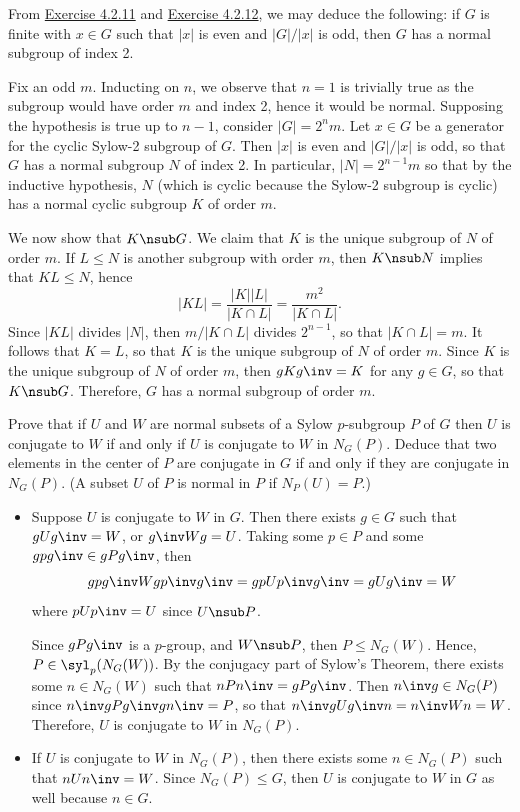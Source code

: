 \begin{sol}
	From \hyperref[ex4.2.11]{Exercise 4.2.11} and \hyperref[ex4.2.12]{Exercise 4.2.12}, we may deduce the following: if $G$ is finite with $x \in G$ such that $|x|$ is even and $|G|/|x|$ is odd, then $G$ has a normal subgroup of index 2.

	Fix an odd $m$. Inducting on $n$, we observe that $n = 1$ is trivially true as the subgroup would have order $m$ and index 2, hence it would be normal. Supposing the hypothesis is true up to $n - 1$, consider $|G| = 2^nm$. Let $x \in G$ be a generator for the cyclic Sylow-2 subgroup of $G$. Then $|x|$ is even and $|G|/|x|$ is odd, so that $G$ has a normal subgroup $N$ of index 2. In particular, $|N| = 2^{n - 1}m$ so that by the inductive hypothesis, $N$ (which is cyclic because the Sylow-2 subgroup is cyclic) has a normal cyclic subgroup $K$ of order $m$.

	We now show that $K \nsub G$. We claim that $K$ is the unique subgroup of $N$ of order $m$. If $L \leq N$ is another subgroup with order $m$, then $K \nsub N$ implies that $KL \leq N$, hence
	\[|KL| = \frac{|K||L|}{|K \cap L|} = \frac{m^2}{|K \cap L|}.\]
	Since $|KL|$ divides $|N|$, then $m/|K \cap L|$ divides $2^{n - 1}$, so that $|K \cap L| = m$. It follows that $K = L$, so that $K$ is the unique subgroup of $N$ of order $m$. Since $K$ is the unique subgroup of $N$ of order $m$, then $gKg\inv = K$ for any $g \in G$, so that $K \nsub G$. Therefore, $G$ has a normal subgroup of order $m$.
\end{sol}

\begin{exercise}\label{ex4.5.50}
	Prove that if $U$ and $W$ are normal subsets of a Sylow $p$-subgroup $P$ of $G$ then $U$ is conjugate to $W$ if and only if $U$ is conjugate to $W$ in $N_G(P)$. Deduce that two elements in the center of $P$ are conjugate in $G$ if and only if they are conjugate in $N_G(P)$. (A subset $U$ of $P$ is normal in $P$ if $N_P(U) = P$.)
\end{exercise}

\begin{sol}
	\leavevmode
	\begin{itemize}
		\item[\rightimp] Suppose $U$ is conjugate to $W$ in $G$. Then there exists $g \in G$ such that $gUg\inv = W$, or $g\inv Wg = U$. Taking some $p \in P$ and some $gpg\inv \in gPg\inv$, then
		\[gpg\inv W gp\inv g\inv = gpUp\inv g\inv = gUg\inv = W\]
		where $pUp\inv = U$ since $U \nsub P$.

		Since $gPg\inv$ is a $p$-group, and $W \nsub P$, then $P \leq N_G(W)$. Hence, $P \in \syl_p(N_G(W))$. By the conjugacy part of Sylow's Theorem, there exists some $n \in N_G(W)$ such that $nPn\inv = gPg\inv$. Then $n\inv g \in N_G(P)$ since $n\inv gPg\inv gn\inv = P$, so that $n\inv gUg\inv n = n\inv Wn = W$. Therefore, $U$ is conjugate to $W$ in $N_G(P)$.
		\item[\leftimp] If $U$ is conjugate to $W$ in $N_G(P)$, then there exists some $n \in N_G(P)$ such that $nUn\inv = W$. Since $N_G(P) \leq G$, then $U$ is conjugate to $W$ in $G$ as well because $n \in G$.
	\end{itemize}
\end{sol}

